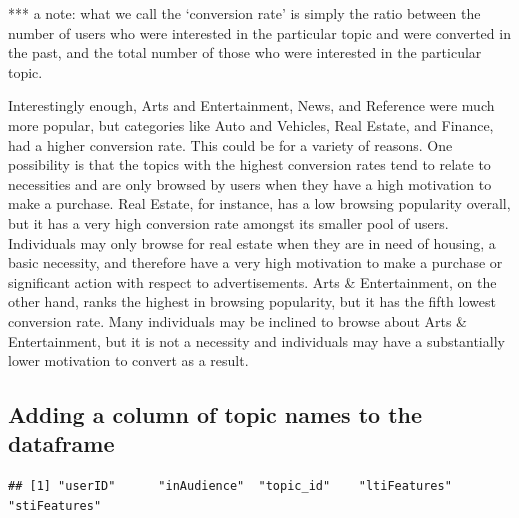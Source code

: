 \documentclass[]{article}
\newenvironment{Shaded}{\begin{snugshade}}{\end{snugshade}}
\newcommand{\KeywordTok}[1]{\textcolor[rgb]{0.13,0.29,0.53}{\textbf{#1}}}
\newcommand{\NormalTok}[1]{#1}
\newcommand{\OperatorTok}[1]{\textcolor[rgb]{0.81,0.36,0.00}{\textbf{#1}}}
\newcommand{\StringTok}[1]{\textcolor[rgb]{0.31,0.60,0.02}{#1}}
\begin{document}
*** a note: what we call the `conversion rate' is simply the ratio
between the number of users who were interested in the particular topic
and were converted in the past, and the total number of those who were
interested in the particular topic.

Interestingly enough, Arts and Entertainment, News, and Reference were
much more popular, but categories like Auto and Vehicles, Real Estate,
and Finance, had a higher conversion rate. This could be for a variety
of reasons. One possibility is that the topics with the highest
conversion rates tend to relate to necessities and are only browsed by
users when they have a high motivation to make a purchase. Real Estate,
for instance, has a low browsing popularity overall, but it has a very
high conversion rate amongst its smaller pool of users. Individuals may
only browse for real estate when they are in need of housing, a basic
necessity, and therefore have a very high motivation to make a purchase
or significant action with respect to advertisements. Arts \&
Entertainment, on the other hand, ranks the highest in browsing
popularity, but it has the fifth lowest conversion rate. Many
individuals may be inclined to browse about Arts \& Entertainment, but
it is not a necessity and individuals may have a substantially lower
motivation to convert as a result.

\hypertarget{adding-a-column-of-topic-names-to-the-dataframe}{%
\subsection{Adding a column of topic names to the
dataframe}\label{adding-a-column-of-topic-names-to-the-dataframe}}

\begin{Shaded}
\end{Shaded}

\begin{verbatim}
## [1] "userID"      "inAudience"  "topic_id"    "ltiFeatures" "stiFeatures"
\end{verbatim}

\begin{Shaded}
\end{Shaded}
\end{document}
